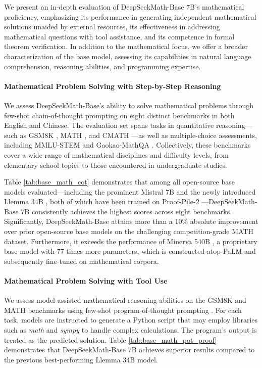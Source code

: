 \begin{itemize}[topsep=0pt]
We present an in-depth evaluation of DeepSeekMath-Base 7B’s mathematical proficiency, emphasizing its performance in generating independent mathematical solutions unaided by external resources, its effectiveness in addressing mathematical questions with tool assistance, and its competence in formal theorem verification. In addition to the mathematical focus, we offer a broader characterization of the base model, assessing its capabilities in natural language comprehension, reasoning abilities, and programming expertise.

\paragraph{Mathematical Problem Solving with Step-by-Step Reasoning}

We assess DeepSeekMath-Base's ability to solve mathematical problems through few-shot chain-of-thought prompting \citep{cot} on eight distinct benchmarks in both English and Chinese. The evaluation set spans tasks in quantitative reasoning—such as GSM8K \citep{gsm8k}, MATH \citep{MATH}, and CMATH \citep{wei2023cmath}—as well as multiple-choice assessments, including MMLU-STEM \citep{mmlu} and Gaokao-MathQA \citep{agieval}. Collectively, these benchmarks cover a wide range of mathematical disciplines and difficulty levels, from elementary school topics to those encountered in undergraduate studies.

Table \ref{tab:base_math_cot} demonstrates that among all open-source base models evaluated—including the prominent Mistral 7B \citep{mistral} and the newly introduced Llemma 34B \citep{llemma}, both of which have been trained on Proof-Pile-2 \citep{llemma}—DeepSeekMath-Base 7B consistently achieves the highest scores across eight benchmarks. Significantly, DeepSeekMath-Base attains more than a 10\% absolute improvement over prior open-source base models on the challenging competition-grade MATH dataset. Furthermore, it exceeds the performance of Minerva 540B \citep{minerva}, a proprietary base model with 77 times more parameters, which is constructed atop PaLM \citep{palm} and subsequently fine-tuned on mathematical corpora.

\paragraph{Mathematical Problem Solving with Tool Use} We assess model-assisted mathematical reasoning abilities on the GSM8K and MATH benchmarks using few-shot program-of-thought prompting \citep{pot,pal}. For each task, models are instructed to generate a Python script that may employ libraries such as \textit{math} and \textit{sympy} to handle complex calculations. The program’s output is treated as the predicted solution. Table \ref{tab:base_math_pot_proof} demonstrates that DeepSeekMath-Base 7B achieves superior results compared to the previous best-performing Llemma 34B model.


\end{itemize}
